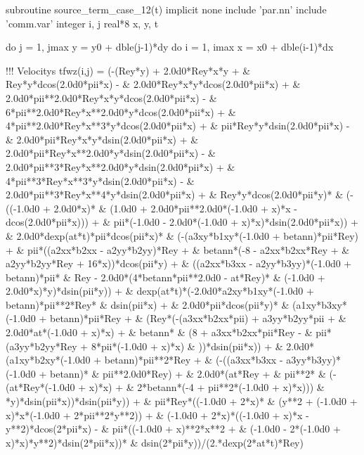 \begin{fortrancode}[caption={Termos fontes}, label={cod:fortran-diffeq_2}]
      subroutine source_term_case_12(t)
      implicit none
      include 'par.nn'
      include 'comm.var'
      integer i, j
      real*8 x, y, t

      do j = 1, jmax
         y    = y0 + dble(j-1)*dy
         do i = 1, imax
            x    = x0 + dble(i-1)*dx

        !!! Velocitys 
        tfwz(i,j) = (-(Rey*y) + 2.0d0*Rey*x*y + 
     & Rey*y*dcos(2.0d0*pii*x) - 
     & 2.0d0*Rey*x*y*dcos(2.0d0*pii*x) + 
     & 2.0d0*pii**2.0d0*Rey*x*y*dcos(2.0d0*pii*x) - 
     & 6*pii**2.0d0*Rey*x**2.0d0*y*dcos(2.0d0*pii*x) + 
     & 4*pii**2.0d0*Rey*x**3*y*dcos(2.0d0*pii*x) + 
     & pii*Rey*y*dsin(2.0d0*pii*x) - 
     & 2.0d0*pii*Rey*x*y*dsin(2.0d0*pii*x) + 
     & 2.0d0*pii*Rey*x**2.0d0*y*dsin(2.0d0*pii*x) - 
     & 2.0d0*pii**3*Rey*x**2.0d0*y*dsin(2.0d0*pii*x) + 
     & 4*pii**3*Rey*x**3*y*dsin(2.0d0*pii*x) - 
     & 2.0d0*pii**3*Rey*x**4*y*dsin(2.0d0*pii*x) + 
     & Rey*y*dcos(2.0d0*pii*y)*
     & (-((-1.0d0 + 2.0d0*x)*
     & (1.0d0 + 2.0d0*pii**2.0d0*(-1.0d0 + x)*x - dcos(2.0d0*pii*x))) + 
     & pii*(-1.0d0 - 2.0d0*(-1.0d0 + x)*x)*dsin(2.0d0*pii*x)) + 
     & 2.0d0*dexp(at*t)*pii*dcos(pii*x)*
     & (-(a3xy*b1xy*(-1.0d0 + betann)*pii*Rey) + 
     & pii*((a2xx*b2xx - a2yy*b2yy)*Rey + 
     & betann*(-8 - a2xx*b2xx*Rey + 
     & a2yy*b2yy*Rey + 16*x))*dcos(pii*y) + 
     & ((a2xx*b3xx - a2yy*b3yy)*(-1.0d0 + betann)*pii*
     & Rey - 2.0d0*(4*betann*pii**2.0d0 - at*Rey)*
     &        (-1.0d0 + 2.0d0*x)*y)*dsin(pii*y)) + 
     & dexp(at*t)*(-2.0d0*a2xy*b1xy*(-1.0d0 + betann)*pii**2*Rey*
     &     dsin(pii*x) + 
     &    2.0d0*pii*dcos(pii*y)*
     &     (a1xy*b3xy*(-1.0d0 + betann)*pii*Rey + 
     &       (Rey*(-(a3xx*b2xx*pii) + a3yy*b2yy*pii + 
     &             2.0d0*at*(-1.0d0 + x)*x) + 
     &          betann*
     &           (8 + a3xx*b2xx*pii*Rey - 
     &             pii*(a3yy*b2yy*Rey + 8*pii*(-1.0d0 + x)*x)
     &             ))*dsin(pii*x)) + 
     &    2.0d0*(a1xy*b2xy*(-1.0d0 + betann)*pii**2*Rey + 
     &       (-((a3xx*b3xx - a3yy*b3yy)*(-1.0d0 + betann)*
     &             pii**2.0d0*Rey) + 
     &          2.0d0*(at*Rey + 
     &             pii**2*
     &              (-(at*Rey*(-1.0d0 + x)*x) + 
     &                2*betann*(-4 + pii**2*(-1.0d0 + x)*x)))
     &            *y)*dsin(pii*x))*dsin(pii*y)) + 
     & pii*Rey*((-1.0d0 + 2*x)*
     &     (y**2 + (-1.0d0 + x)*x*(-1.0d0 + 2*pii**2*y**2)) + 
     &    (-1.0d0 + 2*x)*((-1.0d0 + x)*x - y**2)*dcos(2*pii*x) - 
     &    pii*((-1.0d0 + x)**2*x**2 + 
     &       (-1.0d0 - 2*(-1.0d0 + x)*x)*y**2)*dsin(2*pii*x))*
     &  dsin(2*pii*y))/(2.*dexp(2*at*t)*Rey)


\end{fortrancode}
